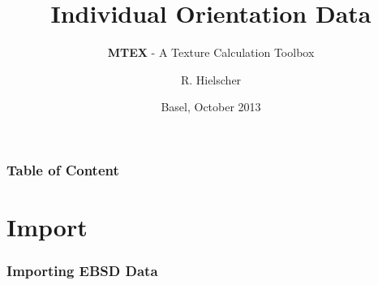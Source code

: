 \documentclass[compress]{beamer}
\author{R. Hielscher}
\title{Individual Orientation Data}
\subtitle{{\bf{\color{red}M}TEX} - A Texture Calculation Toolbox}
\institute{Faculty of Mathematics,\\
	Chemnitz University of Technology, Germany}
\date{Basel, October 2013}
\begin{document}
\begin{frame}
  \maketitle{}
\end{frame}


\begin{frame}
  \frametitle{Table of Content}

\tableofcontents{}

\end{frame}


\section{Import}


\begin{frame}[fragile]
  \frametitle{Importing EBSD Data}


\end{frame}
\end{document}
